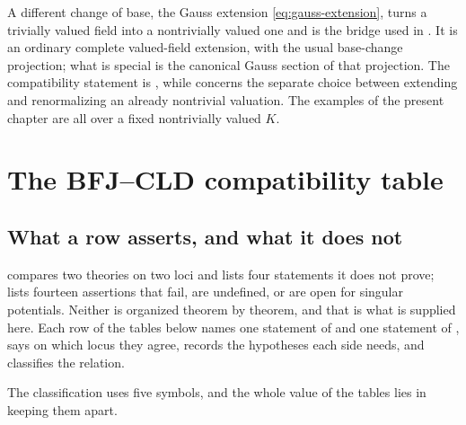 \begin{remark}
\label{rem:ch31-gauss}
A different change of base, the Gauss extension \eqref{eq:gauss-extension},
turns a trivially valued field into a nontrivially valued one and is the
bridge used in .  It is an ordinary complete valued-field
extension, with the usual base-change projection; what is special is the
canonical Gauss section of that projection.  The compatibility statement is
, while
 concerns the separate choice between extending
and renormalizing an already nontrivial valuation.  The examples of the
present chapter are all over a fixed nontrivially valued $K$.
\end{remark}

\section{The BFJ--CLD compatibility table}
\label{sec:ch31-table}

\subsection{What a row asserts, and what it does not}
\label{sec:ch31-table-reading}

 compares two theories on two loci and
lists four statements it does not prove;
 lists fourteen assertions that fail, are
undefined, or are open for singular potentials.  Neither is organized
theorem by theorem, and that is what is supplied here.  Each row of the
tables below names one statement of  and one statement of
, says on which locus they agree, records the hypotheses each
side needs, and classifies the relation.

The classification uses five symbols, and the whole value of the tables lies
in keeping them apart.

